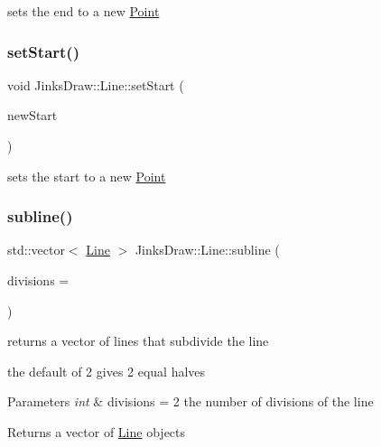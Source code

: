 sets the end to a new \mbox{\hyperlink{class_jinks_draw_1_1_point}{Point}} 

\mbox{\label{class_jinks_draw_1_1_line_a5afb8d3fa0f0b47529014dbfb5e9dbb6}} 
\subsubsection{\texorpdfstring{set\+Start()}{setStart()}}
{\footnotesize\ttfamily void Jinks\+Draw\+::\+Line\+::set\+Start (\begin{DoxyParamCaption}\item[{\mbox{\hyperlink{class_jinks_draw_1_1_point}{Point}} \&}]{new\+Start }\end{DoxyParamCaption})}



sets the start to a new \mbox{\hyperlink{class_jinks_draw_1_1_point}{Point}} 

\mbox{\label{class_jinks_draw_1_1_line_a79047036e61d10ef3b14c660c32e6d64}} 
\subsubsection{\texorpdfstring{subline()}{subline()}}
{\footnotesize\ttfamily std\+::vector$<$ \mbox{\hyperlink{class_jinks_draw_1_1_line}{Line}} $>$ Jinks\+Draw\+::\+Line\+::subline (\begin{DoxyParamCaption}\item[{int}]{divisions = {} }\end{DoxyParamCaption})}



returns a vector of lines that subdivide the line 

the default of 2 gives 2 equal halves 
\begin{DoxyParams}{Parameters}
{\em int} & divisions = 2 the number of divisions of the line \\
\hline
\end{DoxyParams}
\begin{DoxyReturn}{Returns}
a vector of \mbox{\hyperlink{class_jinks_draw_1_1_line}{Line}} objects 
\end{DoxyReturn}
\mbox{\label{class_jinks_draw_1_1_line_a43d8f7b708f5e9851a188c755aa0d963}} 
